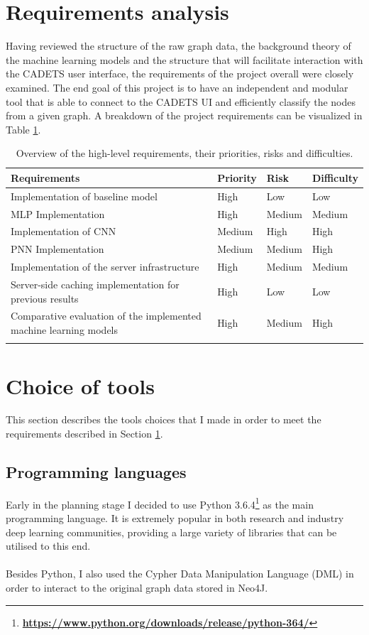 	\section{Requirements analysis} \label{Section 2.4}
	Having reviewed the structure of the raw graph data, the background theory of the machine learning models and the structure that will facilitate interaction with the CADETS user interface, the requirements of the project overall were closely examined. The end goal of this project is to have an independent and modular tool that is able to connect to the CADETS UI and efficiently classify the nodes from a given graph. A breakdown of the project requirements can be visualized in Table \ref{Table 2.2}.
	\begin{longtable}{|p{}|p{} p{} p{}|}
		\textbf{Requirements} & \textbf{Priority} & \textbf{Risk} & \textbf{Difficulty} \\
		\hline
		Implementation of baseline model & High & Low & Low \\
		MLP Implementation & High & Medium & Medium \\
		Implementation of CNN & Medium & High & High \\
		PNN Implementation & Medium & Medium & High \\
		Implementation of the server infrastructure & High & Medium & Medium \\
		Server-side caching implementation for previous results & High & Low & Low \\
		Comparative evaluation of the implemented machine learning models & High & Medium & High \\
		\hline
		\caption[Requirements overview]{\centering Overview of the high-level requirements, their priorities, risks and difficulties.}
		\label{Table 2.2}
	\end{longtable}
	\section{Choice of tools} \label{Section 2.5}
	This section describes the tools choices that I made in order to meet the requirements described in Section \ref{Section 2.4}. 
	\subsection{Programming languages} \label{Section 2.5.1}
	Early in the planning stage I decided to use Python 3.6.4\footnote{\textbf{\url{https://www.python.org/downloads/release/python-364/}}} as the main programming language. It is extremely popular in both research and industry deep learning communities, providing a large variety of libraries that can be utilised to this end. 
	\\ \\
	Besides Python, I also used the Cypher Data Manipulation Language (DML) in order to interact to the original graph data stored in Neo4J.  
	
